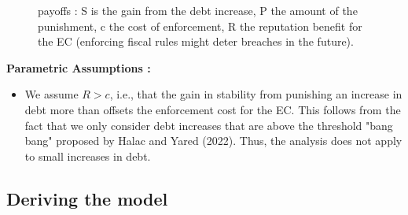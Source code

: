 \documentclass{article}
\begin{document}
\begin{figure}[H]
\caption{payoffs : S is the gain from the debt increase, P the amount of the punishment, c the cost of enforcement, R the reputation benefit for the EC (enforcing fiscal rules might deter breaches in the future).}  
\end{figure}  

\textbf{Parametric Assumptions : }
\begin{itemize}
    \item We assume $R>c$, i.e., that the gain in stability from punishing an increase in debt more than offsets the enforcement cost for the EC. This follows from the fact that we only consider debt increases that are above the threshold "bang bang" proposed by Halac and Yared (2022). Thus, the analysis does not apply to small increases in debt. 
\end{itemize}
\subsection{Deriving the model}
\end{document}
